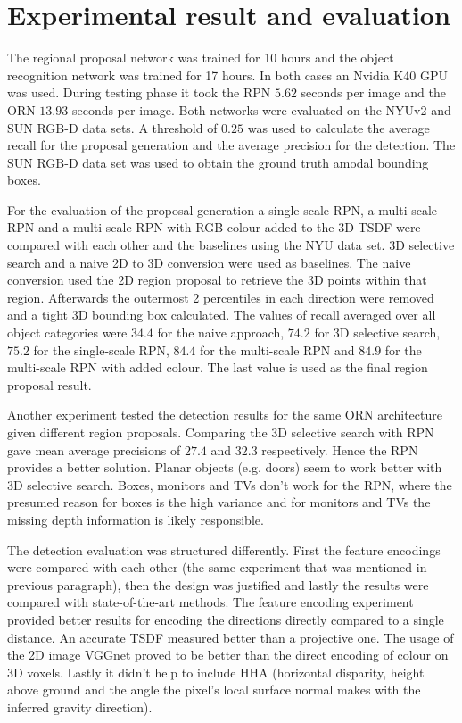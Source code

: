 \documentclass[12pt]{scrartcl}
\begin{document}
\section{Experimental result and evaluation}

The regional proposal network was trained for 10 hours and the object recognition
network was trained for 17 hours. In both cases an Nvidia K40 GPU was used.
During testing phase it took the RPN \(5.62\) seconds per image and the ORN
\(13.93\) seconds per image. Both networks were evaluated on the NYUv2\cite{Silberman2012}
and SUN RGB-D\cite{Song2015} data sets.
A threshold of \(0.25\) was used to calculate the average recall for the proposal
generation and the average precision for the detection. The SUN RGB-D data set
was used to obtain the ground truth amodal bounding boxes.

For the evaluation of the proposal generation a single-scale RPN, a multi-scale RPN
and a multi-scale RPN with RGB colour added to the 3D TSDF were compared with
each other and the baselines using the NYU data set. 3D selective search
and a naive 2D to 3D conversion were used as baselines. The naive conversion used the
2D region proposal to retrieve the 3D points within that region. Afterwards the
outermost 2 percentiles in each direction were removed and a tight 3D bounding
box calculated. The values of recall averaged over all object categories were
\(34.4\) for the naive approach, \(74.2\) for 3D selective search, \(75.2\) for
the single-scale RPN, \(84.4\) for the multi-scale RPN and \(84.9\) for the
multi-scale RPN with added colour. The last value is used as the final region
proposal result.

Another experiment tested the detection results for the same ORN architecture
given different region proposals. Comparing the 3D selective search with
RPN gave mean average precisions of \(27.4\) and \(32.3\) respectively. Hence
the RPN provides a better solution. Planar objects (e.g. doors) seem to work
better with 3D selective search. Boxes, monitors and TVs don't work for the RPN,
where the presumed reason for boxes is the high variance and for monitors and TVs
the missing depth information is likely responsible.

The detection evaluation was structured differently. First the feature encodings
were compared with each other (the same experiment that was mentioned in previous
paragraph), then the design was justified and lastly the results were compared
with state-of-the-art methods. The feature encoding experiment provided better
results for encoding the directions directly compared to a single distance.
An accurate TSDF measured better than a projective one. The usage of the 2D image
VGGnet proved to be better than the direct encoding of colour on 3D voxels.
Lastly it didn't help to include HHA (horizontal disparity, height above ground
and the angle the pixel's local surface normal makes with the inferred gravity
direction).
\end{document}
